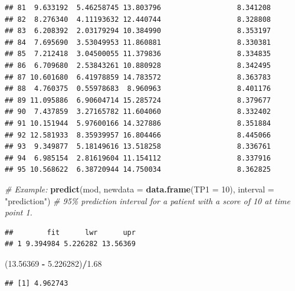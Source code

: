 \documentclass[
]{article}
\newenvironment{Shaded}{\begin{snugshade}}{\end{snugshade}}
\newcommand{\AttributeTok}[1]{\textcolor[rgb]{0.13,0.29,0.53}{#1}}
\newcommand{\CommentTok}[1]{\textcolor[rgb]{0.56,0.35,0.01}{\textit{#1}}}
\newcommand{\DecValTok}[1]{\textcolor[rgb]{0.00,0.00,0.81}{#1}}
\newcommand{\FloatTok}[1]{\textcolor[rgb]{0.00,0.00,0.81}{#1}}
\newcommand{\FunctionTok}[1]{\textcolor[rgb]{0.13,0.29,0.53}{\textbf{#1}}}
\newcommand{\NormalTok}[1]{#1}
\newcommand{\SpecialCharTok}[1]{\textcolor[rgb]{0.81,0.36,0.00}{\textbf{#1}}}
\newcommand{\StringTok}[1]{\textcolor[rgb]{0.31,0.60,0.02}{#1}}
\begin{document}
\begin{verbatim}
## 81  9.633192  5.46258745 13.803796                  8.341208
## 82  8.276340  4.11193632 12.440744                  8.328808
## 83  6.208392  2.03179294 10.384990                  8.353197
## 84  7.695690  3.53049953 11.860881                  8.330381
## 85  7.212418  3.04500055 11.379836                  8.334835
## 86  6.709680  2.53843261 10.880928                  8.342495
## 87 10.601680  6.41978859 14.783572                  8.363783
## 88  4.760375  0.55978683  8.960963                  8.401176
## 89 11.095886  6.90604714 15.285724                  8.379677
## 90  7.437859  3.27165782 11.604060                  8.332402
## 91 10.151944  5.97600166 14.327886                  8.351884
## 92 12.581933  8.35939957 16.804466                  8.445066
## 93  9.349877  5.18149616 13.518258                  8.336761
## 94  6.985154  2.81619604 11.154112                  8.337916
## 95 10.568622  6.38720944 14.750034                  8.362825
\end{verbatim}

\begin{Shaded}
\begin{Highlighting}[]
\CommentTok{\# Example:}
\FunctionTok{predict}\NormalTok{(mod, }\AttributeTok{newdata =} \FunctionTok{data.frame}\NormalTok{(}\AttributeTok{TP1 =} \DecValTok{10}\NormalTok{), }\AttributeTok{interval =} \StringTok{"prediction"}\NormalTok{) }\CommentTok{\# 95\% prediction interval for a patient with a score of 10 at time point 1.}
\end{Highlighting}
\end{Shaded}

\begin{verbatim}
##        fit      lwr      upr
## 1 9.394984 5.226282 13.56369
\end{verbatim}

\begin{Shaded}
\begin{Highlighting}[]
\NormalTok{(}\FloatTok{13.56369} \SpecialCharTok{{-}} \FloatTok{5.226282}\NormalTok{)}\SpecialCharTok{/}\FloatTok{1.68}
\end{Highlighting}
\end{Shaded}

\begin{verbatim}
## [1] 4.962743
\end{verbatim}
\end{document}
